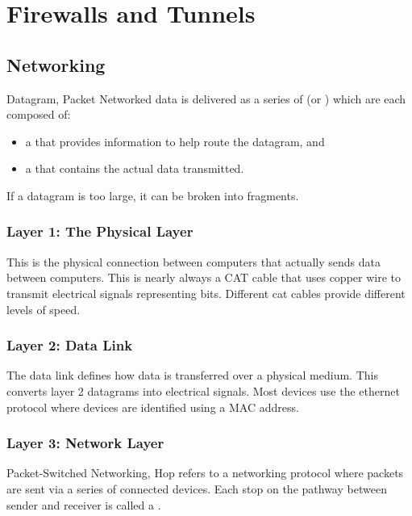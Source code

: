 \chapter{Firewalls and Tunnels}

\section{Networking}

\begin{dfnbox}{Datagram, Packet}{}
    Networked data is delivered as a series of  (or ) which are each composed of:
    \begin{itemize}
        \item a  that provides information to help route the datagram, and
        \item a  that contains the actual data transmitted.
    \end{itemize}
\end{dfnbox}

If a datagram is too large, it can be broken into fragments.

\subsection*{Layer 1: The Physical Layer}
This is the physical connection between computers that actually sends data between computers. This is nearly always a CAT cable that uses copper wire to transmit electrical signals representing bits. Different cat cables provide different levels of speed.

\subsection*{Layer 2: Data Link}
The data link defines how data is transferred over a physical medium. This converts layer 2 datagrams into electrical signals. Most devices use the ethernet protocol where devices are identified using a MAC address.

\subsection*{Layer 3: Network Layer}

\begin{dfnbox}{Packet-Switched Networking, Hop}{}
     refers to a networking protocol where packets are sent via a series of connected devices. Each stop on the pathway between sender and receiver is called a .
\end{dfnbox}


